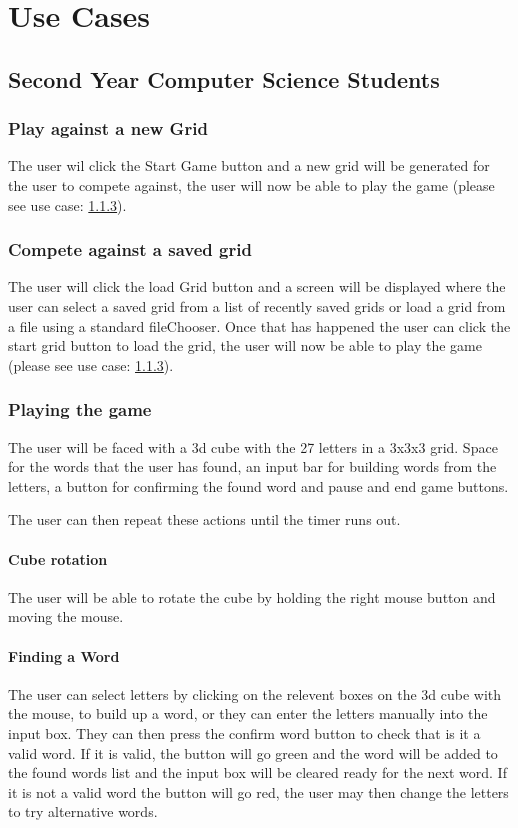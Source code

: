 \documentclass{project}
\begin{document}
	

\section{Use Cases}
	\subsection{Second Year Computer Science Students}
		\subsubsection{Play against a new Grid}
			The user wil click the Start Game button and a new grid will be generated for 	the user to compete against, the user will now be able to play the game (please see use case: \ref{Playing the game}).
		\subsubsection{Compete against a saved grid}
			The user will click the load Grid button and a screen will be displayed where the user can select a saved grid from a list of recently saved grids or load a grid from a file using a standard fileChooser. Once that has happened the user can click the start grid button to load the grid, the user will now be able to play the game (please see use case: \ref{Playing the game}).
		\subsubsection{Playing the game} \label{Playing the game}
			The user will be faced with a 3d cube with the 27 letters in a 3x3x3 grid. Space for the words that the user has found, an input bar for building words from the letters, a button for confirming the found word and pause and end game buttons. 
			
			The user can then repeat these actions until the timer runs out.
			
			\paragraph{Cube rotation}
			The user will be able to rotate the cube by holding the right mouse button and moving the mouse.
			\paragraph{Finding a Word}
			The user can select letters by clicking on the relevent boxes on the 3d cube with the mouse, to build up a word, or they can enter the letters manually into the input box. They can then press the confirm word button to check that is it a valid word. If it is valid, the button will go green and the word will be added to the found words list and the input box will be cleared ready for the next word. If it is not a valid word the button will go red, the user may then change the letters to try alternative words.
		
\end{document}
